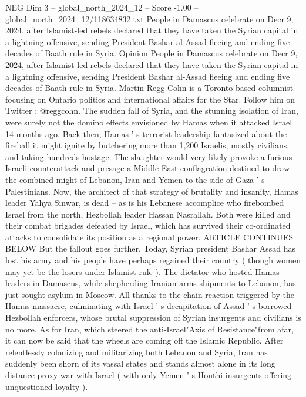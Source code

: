 \begin{textsample}{NEG Dim 3 – global\_north\_2024\_12 – Score -1.00 – global\_north\_2024\_12/118634832.txt}  \label{ex:f3_neg_242}
People in Damascus celebrate on Decr 9, 2024, after Islamist-led rebels declared that they have taken the Syrian capital in a lightning offensive, sending President Bashar al-Assad fleeing and ending five decades of Baath rule in Syria.
Opinion People in Damascus celebrate on Decr 9, 2024, after Islamist-led rebels declared that they have taken the Syrian capital in a lightning offensive, sending President Bashar al-Assad fleeing and ending five decades of Baath rule in Syria.
Martin Regg Cohn is a Toronto-based columnist focusing on Ontario politics and international affairs for the Star.
Follow him on Twitter : @reggcohn.
The sudden fall of Syria, and the stunning isolation of Iran, were surely not the domino effects envisioned by Hamas when it attacked Israel 14 months ago.
Back then, Hamas ' s terrorist leadership fantasized about the fireball it might ignite by butchering more than 1,200 Israelis, mostly civilians, and taking hundreds hostage.
The slaughter would very likely provoke a furious Israeli counterattack and presage a Middle East conflagration destined to draw the combined might of Lebanon, Iran and Yemen to the side of Gaza ' s Palestinians.
Now, the architect of that strategy of brutality and insanity, Hamas leader Yahya Sinwar, is dead -- as is his Lebanese accomplice who firebombed Israel from the north, Hezbollah leader Hassan Nasrallah.
Both were killed and their combat brigades defeated by Israel, which has survived their co-ordinated attacks to consolidate its position as a regional power.
ARTICLE CONTINUES BELOW But the fallout goes further.
Today, Syrian president Bashar Assad has lost his army and his people have perhaps regained their country ( though women may yet be the losers under Islamist rule ).
The dictator who hosted Hamas leaders in Damascus, while shepherding Iranian arms shipments to Lebanon, has just sought asylum in Moscow.
All thanks to the chain reaction triggered by the Hamas massacre, culminating with Israel ' s decapitation of Assad ' s borrowed Hezbollah enforcers, whose brutal suppression of Syrian insurgents and civilians is no more.
As for Iran, which steered the anti-Israel"Axis of Resistance"from afar, it can now be said that the wheels are coming off the Islamic Republic.
After relentlessly colonizing and militarizing both Lebanon and Syria, Iran has suddenly been shorn of its vassal states and stands almost alone in its long distance proxy war with Israel ( with only Yemen ' s Houthi insurgents offering unquestioned loyalty ).

\end{textsample}

